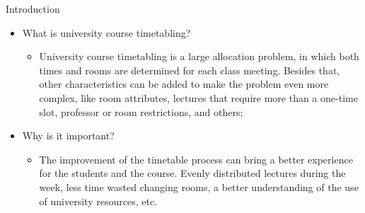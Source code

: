 \documentclass{beamer}
\begin{document}
\capa


\begin{frame}{Introduction}
\begin{itemize}
    \item What is university course timetabling? \begin{itemize}
        \item University course timetabling is a large allocation problem, in which both times and rooms are determined for each class meeting. Besides that, other characteristics can be added to make the problem even more complex, like room attributes, lectures that require more than a one-time slot, professor or room restrictions, and others;
    \end{itemize}
    \item Why is it important?
    \begin{itemize}
        \item The improvement of the timetable process can bring a better experience for the students and the course. Evenly distributed lectures during the week, less time wasted changing rooms, a better understanding of the use of university resources, etc.
    \end{itemize}
\end{itemize}
\end{frame}
\end{document}
